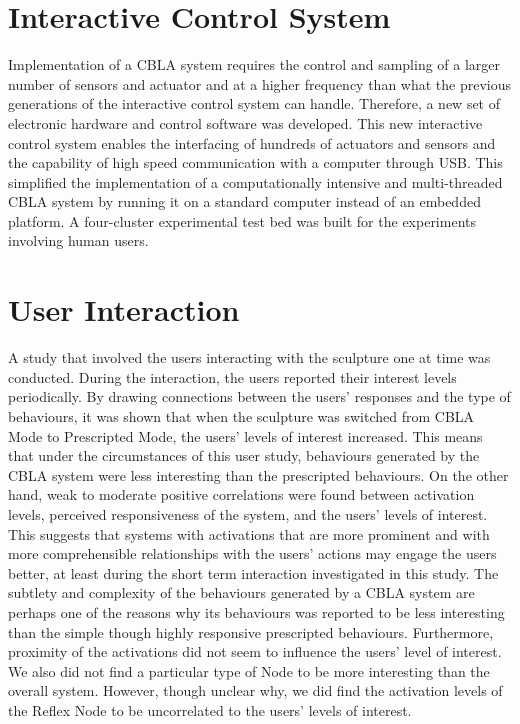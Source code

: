 \section{Interactive Control System}
Implementation of a CBLA system requires the control and sampling of a larger number of sensors and actuator and at a higher frequency than what the previous generations of the interactive control system can handle. Therefore, a new set of electronic hardware and control software was developed. This new interactive control system enables the interfacing of hundreds of actuators and sensors and the capability of high speed communication with a computer through USB. This simplified the implementation of a computationally intensive and multi-threaded CBLA system by running it on a standard computer instead of an embedded platform. A four-cluster experimental test bed was built for the experiments involving human users.

\section{User Interaction}
A study that involved the users interacting with the sculpture one at time was conducted. During the interaction, the users reported their interest levels periodically. By drawing connections between the users' responses and the type of behaviours, it was shown that when the sculpture was switched from CBLA Mode to Prescripted Mode, the users' levels of interest increased. This means that under the circumstances of this user study, behaviours generated by the CBLA system were less interesting than the prescripted behaviours. On the other hand, weak to moderate positive correlations were found between activation levels, perceived responsiveness of the system, and the users' levels of interest. This suggests that systems with activations that are more prominent and with more comprehensible relationships with the users' actions may engage the users better, at least during the short term interaction investigated in this study. The subtlety and complexity of the behaviours generated by a CBLA system are perhaps one of the reasons why its behaviours was reported to be less interesting than the simple though highly responsive prescripted behaviours. Furthermore, proximity of the activations did not seem to influence the users' level of interest. We also did not find a particular type of Node to be more interesting than the overall system. However, though unclear why, we did find the activation levels of the Reflex Node to be uncorrelated to the users' levels of interest. 

